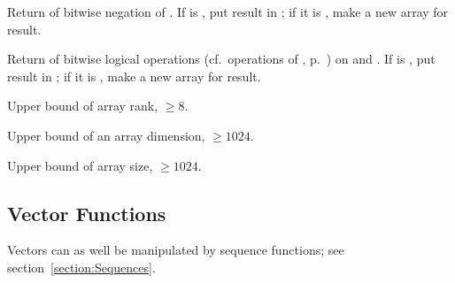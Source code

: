 \begin{LIST}{1cm}
  {
  Return  of bitwise negation of . If  is \T, put
  result in ; if it is \NIL, make a new array for
  result. 
  }

  {
  Return  of bitwise logical operations
  (cf.\ operations of , p.\ \pageref{section:Logic Functions}) on
   and  .  If  is \T, put result in
  ; if it is \NIL, make a new array for
  result. 
  }

  {
  Upper bound of array rank, $\geq 8$.
  }

  {
  Upper bound of an array dimension, $\geq 1024$.
  }

  {
  Upper bound of array size, $\geq 1024$.
  }

\end{LIST}


\subsection{Vector Functions} 

Vectors can as well be manipulated by sequence functions; see
section~\ref{section:Sequences}. 

